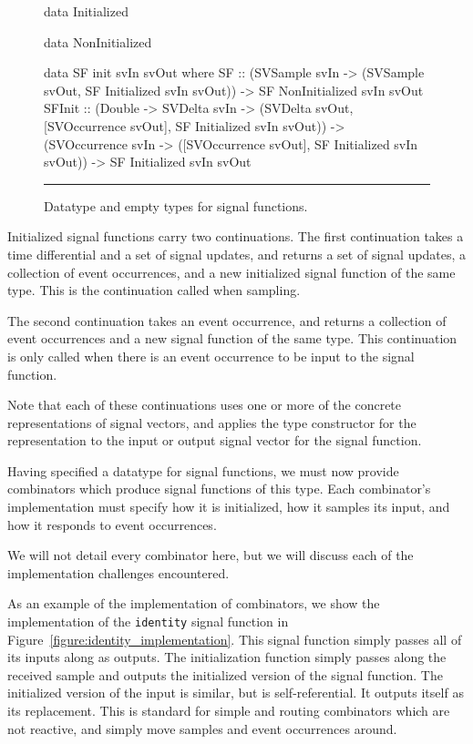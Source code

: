 \documentclass[draft]{llncs}
\begin{document}
\begin{figure}
\begin{code}
data Initialized

data NonInitialized

data SF init svIn svOut where
  SF     ::    (SVSample svIn 
                  -> (SVSample svOut,
                      SF Initialized svIn svOut)) 
            -> SF NonInitialized svIn svOut
  SFInit ::    (Double 
                  -> SVDelta svIn
                  -> (SVDelta svOut,
                      [SVOccurrence svOut],
                      SF Initialized svIn svOut)) 
            -> (SVOccurrence svIn
                  -> ([SVOccurrence svOut],
                      SF Initialized svIn svOut))
            -> SF Initialized svIn svOut
\end{code}
\hrule
\caption{Datatype and empty types for signal functions.}
\label{figure:signal_function_datatype}
\end{figure}

Initialized signal functions carry two continuations. The first continuation
takes a time differential and a set of signal updates, and returns a set of
signal updates, a collection of event occurrences, and a new initialized signal
function of the same type. This is the continuation called when sampling.

The second continuation takes an event occurrence, and returns a collection of
event occurrences and a new signal function of the same type. This continuation
is only called when there is an event occurrence to be input to the signal
function.

Note that each of these continuations uses one or more of the concrete
representations of signal vectors, and applies the type constructor for the
representation to the input or output signal vector for the signal function.

Having specified a datatype for signal functions, we must now provide
combinators which produce signal functions of this type. Each combinator's
implementation must specify how it is initialized, how it samples its input, and
how it responds to event occurrences.

We will not detail every combinator here, but we will discuss each of the
implementation challenges encountered.

As an example of the implementation of combinators, we show the implementation
of the {\tt identity} signal function in Figure~\ref{figure:identity_implementation}.
This signal function simply passes all of its inputs along as outputs. The
initialization function simply passes along the received sample and outputs the
initialized version of the signal function. The initialized version of the input
is similar, but is self-referential. It outputs itself as its replacement. This
is standard for simple and routing combinators which are not reactive, and
simply move samples and event occurrences around.
\end{document}
